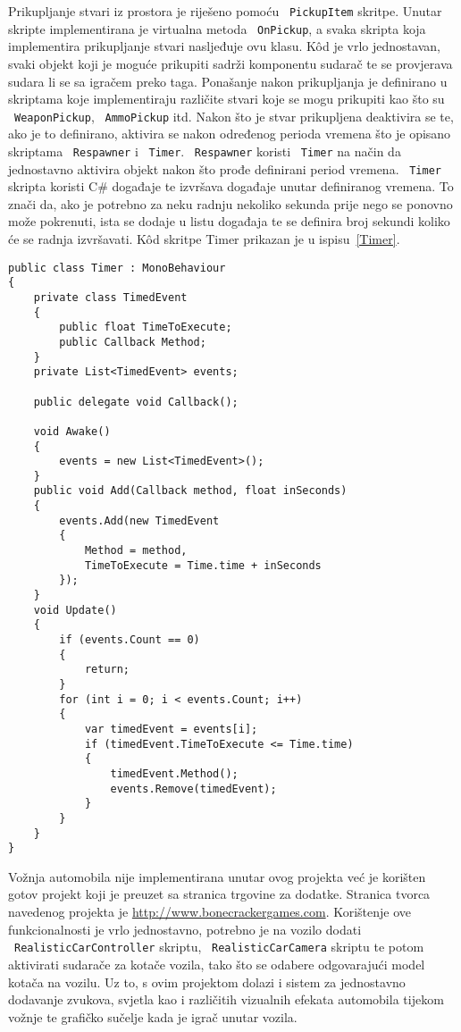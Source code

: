 Prikupljanje stvari iz prostora je riješeno pomoću ~\texttt{PickupItem} skritpe. Unutar
skripte implementirana je virtualna metoda ~\texttt{OnPickup}, a svaka skripta koja
implementira prikupljanje stvari nasljeđuje ovu klasu. K\^od je vrlo jednostavan,
svaki objekt koji je moguće prikupiti sadrži komponentu sudarač te se provjerava
sudara li se sa igračem preko taga. Ponašanje nakon prikupljanja je definirano u
skriptama koje implementiraju različite stvari koje se mogu prikupiti kao što su
~\texttt{WeaponPickup}, ~\texttt{AmmoPickup} itd. Nakon što je stvar prikupljena deaktivira se te, ako
je to definirano, aktivira se nakon određenog perioda vremena što je opisano
skriptama ~\texttt{Respawner} i ~\texttt{Timer}. ~\texttt{Respawner} koristi ~\texttt{Timer} na način da jednostavno
aktivira objekt nakon što prođe definirani period vremena. ~\texttt{Timer} skripta koristi C\#
događaje te izvršava događaje unutar definiranog vremena. To znači da, ako je
potrebno za neku radnju nekoliko sekunda prije nego se ponovno može pokrenuti, ista
se dodaje u listu događaja te se definira broj sekundi koliko će se radnja
izvršavati. K\^od skritpe Timer prikazan je u ispisu~\ref{Timer}.
\begin{lstlisting}[caption={Odbrojavač}, label=Timer]
public class Timer : MonoBehaviour
{
    private class TimedEvent
    {
        public float TimeToExecute;
        public Callback Method;
    }
    private List<TimedEvent> events;

    public delegate void Callback();

    void Awake()
    {
        events = new List<TimedEvent>();
    }
    public void Add(Callback method, float inSeconds)
    {
        events.Add(new TimedEvent
        {
            Method = method,
            TimeToExecute = Time.time + inSeconds
        });
    }
    void Update()
    {
        if (events.Count == 0)
        {
            return;
        }
        for (int i = 0; i < events.Count; i++)
        {
            var timedEvent = events[i];
            if (timedEvent.TimeToExecute <= Time.time)
            {
                timedEvent.Method();
                events.Remove(timedEvent);
            }
        }
    }
}
\end{lstlisting}
Vožnja automobila nije implementirana unutar ovog projekta već je korišten gotov
projekt koji je preuzet sa stranica trgovine za dodatke. Stranica tvorca navedenog
projekta je \url{http://www.bonecrackergames.com}. Korištenje ove funkcionalnosti je
vrlo jednostavno, potrebno je na vozilo dodati ~\texttt{RealisticCarController} skriptu,
~\texttt{RealisticCarCamera} skriptu te potom aktivirati sudarače za kotače vozila, tako što
se odabere odgovarajući model kotača na vozilu. Uz to, s ovim projektom dolazi i
sistem za jednostavno dodavanje zvukova, svjetla kao i različitih vizualnih efekata
automobila tijekom vožnje te grafičko sučelje kada je igrač unutar vozila.

